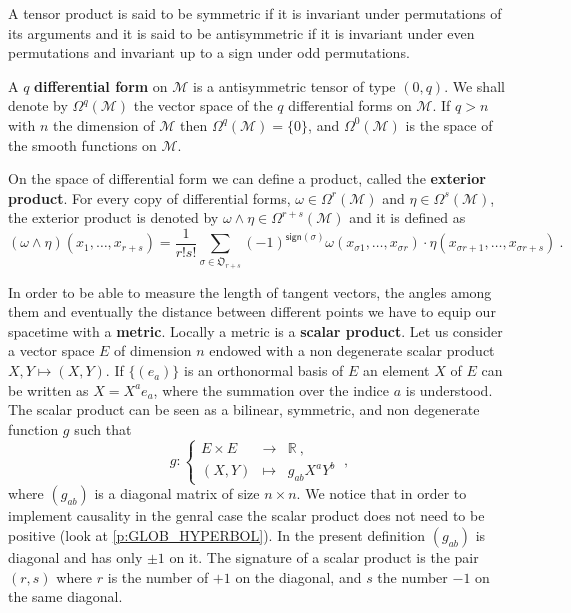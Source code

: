 \documentclass[11pt]{book}
\newcommand{\Mcal}{\mathcal{M}}
\newcommand{\Rbb}{\mathbb{R}}
\newcommand{\Orak}{\mathfrak{O}}
\theoremstyle{break}
\begin{document}
A tensor product is said to be symmetric if it is invariant under permutations of its arguments and it is said to be antisymmetric if it is invariant under even permutations and invariant up to a sign under odd permutations.


A $q$ \textbf{differential form} on $\Mcal$ is a antisymmetric tensor of type $(0,q)$. We shall denote by $\Omega^q(\Mcal)$ the vector space of the $q$ differential forms on $\Mcal$. If $q > n$ with $n$ the dimension of $\Mcal$ then $\Omega^q(\Mcal)=\{0\}$, and $\Omega^0(\Mcal)$ is the space of the smooth functions on $\Mcal$.


On the space of differential form we can define a product, called the \textbf{exterior product}. For every copy of differential forms, $\omega \in \Omega^r(\Mcal)$ and $\eta \in \Omega^s(\Mcal)$, the exterior product is denoted by 
$\omega \wedge \eta \in \Omega^{r+s}(\Mcal)$ and it is defined  as
%
\begin{equation*}
(\omega \wedge \eta)(x_1,\dots,x_{r+s}) = \frac{1}{r!s!} \sum_{\sigma \in \Orak_{r+s}} (-1)^{\mathsf{sign}(\sigma)} \omega(x_{\sigma{1}},\dots,x_{\sigma{r}}) \cdot \eta(x_{\sigma{r+1}},\dots,x_{\sigma{r+s}}) \ .
\end{equation*}


\bigskip


In order to be able to measure the length of tangent vectors, the angles among them and eventually the distance between different points we have to equip our spacetime with a \textbf{metric}. Locally a metric is a \textbf{scalar product}. Let us consider a vector space $E$ of dimension $n$ endowed with a non degenerate scalar product $X,Y \mapsto (X,Y)$. If $\{(e_a)\}$ is an orthonormal basis of $E$ an element $X$ of $E$ can be written as $X = X^a e_a$, where the summation over the indice $a$ is understood. The scalar product can be seen as a bilinear, symmetric, and non degenerate function $g$ such that
%
\begin{equation*}
g : \left\{ 
\begin{array}{lcl}
E \times E & \to & \Rbb \ , \\
(X,Y) & \mapsto & g_{ab} X^a Y^b
\end{array}
\right. \ ,
\end{equation*}
%
where $(g_{ab})$ is a diagonal matrix of size $n \times n$. We notice that in order to implement causality in the genral case the scalar product does not need to be positive (look at \ref{p:GLOB_HYPERBOL}). In the present definition $(g_{ab})$ is diagonal and has only $\pm 1$ on it. The signature of a scalar product is the pair $(r,s)$ where $r$ is the number of $+1$ on the diagonal, and $s$ the number $-1$ on the same diagonal. 
\end{document}
